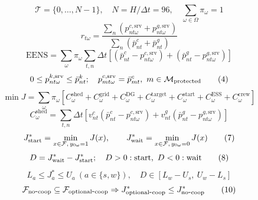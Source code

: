 \documentclass[11pt]{article}
\begin{document}
\begin{equation}
\mathcal T=\{0,\ldots,N-1\},\quad N=H/\Delta t=96,\quad \sum_{\omega\in\Omega}\pi_\omega=1
\tag{1}
\end{equation}
\begin{equation}
r_{t\omega}=\frac{\sum_n(p^{c,\mathrm{srv}}_{nt\omega}+p^{g,\mathrm{srv}}_{nt\omega})}{\sum_n(\bar p^c_{nt}+\bar p^g_{nt})}
\tag{2}
\end{equation}
\begin{equation}
\mathrm{EENS}=\sum_\omega\pi_\omega\sum_{t,n}\Delta t[(\bar p^c_{nt}-p^{c,\mathrm{srv}}_{nt\omega})+(\bar p^g_{nt}-p^{g,\mathrm{srv}}_{nt\omega})]
\tag{3}
\end{equation}
\begin{equation}
0\le p^{k,\mathrm{srv}}_{nt\omega}\le\bar p^k_{nt};\quad p^{c,\mathrm{srv}}_{mt\omega}=\bar p^c_{mt},\ m\in\mathcal M_{\rm protected}
\tag{4}
\end{equation}
\begin{equation}
\min J=\sum_\omega\pi_\omega[C^{\mathrm{shed}}_\omega+C^{\mathrm{grid}}_\omega+C^{\mathrm{DG}}_\omega+C^{\mathrm{target}}_\omega+C^{\mathrm{start}}_\omega+C^{\mathrm{ESS}}_\omega+C^{\mathrm{crew}}_\omega]
\tag{5}
\end{equation}
\begin{equation}
C^{\mathrm{shed}}_\omega=\sum_{t,n}\Delta t[v^c_{nt}(\bar p^c_{nt}-p^{c,\mathrm{srv}}_{nt\omega})+v^g_{nt}(\bar p^g_{nt}-p^{g,\mathrm{srv}}_{nt\omega})]
\tag{6}
\end{equation}
\begin{equation}
J^*_{\rm start}=\min_{x\in\mathcal F,\,y_{0\omega}=1}J(x),\qquad J^*_{\rm wait}=\min_{x\in\mathcal F,\,y_{0\omega}=0}J(x)
\tag{7}
\end{equation}
\begin{equation}
D=J^*_{\rm wait}-J^*_{\rm start};\quad D>0:\mathrm{start},\ D<0:\mathrm{wait}
\tag{8}
\end{equation}
\begin{equation}
L_a\le J_a^*\le U_a\ (a\in\{s,w\}),\quad D\in[L_w-U_s,\ U_w-L_s]
\tag{9}
\end{equation}
\begin{equation}
\mathcal F_{\rm no\mbox{-}coop}\subseteq\mathcal F_{\rm optional\mbox{-}coop}\Rightarrow J^*_{\rm optional\mbox{-}coop}\le J^*_{\rm no\mbox{-}coop}
\tag{10}
\end{equation}
\end{document}
